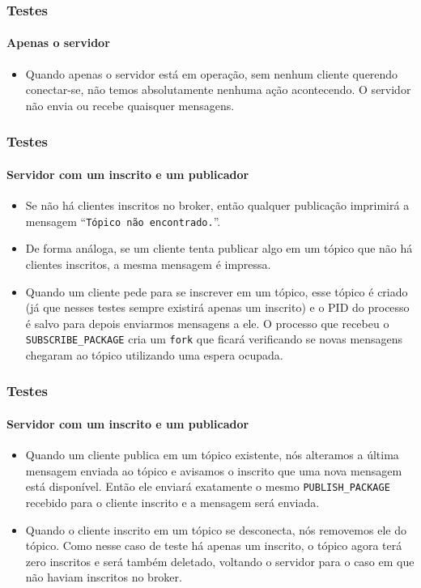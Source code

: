 \documentclass[10pt]{beamer}
\begin{document}
    \begin{frame}[t]
      \frametitle{Testes}
      \framesubtitle{Apenas o servidor}
      \begin{itemize}
        \item Quando apenas o servidor está em operação, sem nenhum cliente
          querendo conectar-se, não temos absolutamente nenhuma ação
          acontecendo. O servidor não envia ou recebe quaisquer mensagens.
      \end{itemize}
    \end{frame}

    \begin{frame}[t]
      \frametitle{Testes}
      \framesubtitle{Servidor com um inscrito e um publicador}
      \begin{itemize}
        \item Se não há clientes inscritos no broker, então qualquer publicação
          imprimirá a mensagem  ``\texttt{Tópico não encontrado.}''.
        \item De forma análoga, se um cliente tenta publicar algo em um tópico
          que não há clientes inscritos, a mesma mensagem é impressa.
        \item Quando um cliente pede para se inscrever em um tópico, esse tópico
          é criado (já que nesses testes sempre existirá apenas um inscrito) e
          o PID do processo é salvo para depois enviarmos mensagens a ele.
          O processo que recebeu o \texttt{SUBSCRIBE\_PACKAGE} cria um
          \texttt{fork} que ficará verificando se novas mensagens chegaram ao
          tópico utilizando uma espera ocupada.
      \end{itemize}
    \end{frame}

    \begin{frame}[t]
      \frametitle{Testes}
      \framesubtitle{Servidor com um inscrito e um publicador}
      \begin{itemize}
        \item Quando um cliente publica em um tópico existente, nós alteramos a
          última mensagem enviada ao tópico e avisamos o inscrito que uma nova
          mensagem está disponível. Então ele enviará exatamente o mesmo
          \texttt{PUBLISH\_PACKAGE} recebido para o cliente inscrito e a
          mensagem será enviada.
        \item Quando o cliente inscrito em um tópico se desconecta, nós
          removemos ele do tópico. Como nesse caso de teste há apenas um
          inscrito, o tópico agora terá zero inscritos e será também deletado,
          voltando o servidor para o caso em que não haviam inscritos no broker.
      \end{itemize}
    \end{frame}
\end{document}
